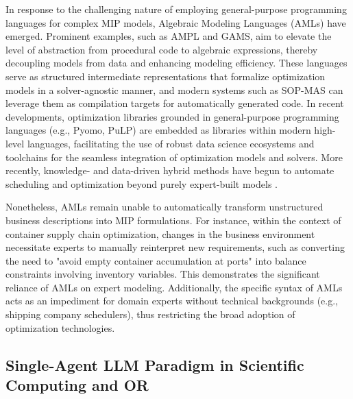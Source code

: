 \documentclass[preprint,12pt]{elsarticle}
\begin{document}
In response to the challenging nature of employing general-purpose programming languages for complex MIP models, Algebraic Modeling Languages (AMLs) have emerged. Prominent examples, such as AMPL and GAMS, aim to elevate the level of abstraction from procedural code to algebraic expressions, thereby decoupling models from data and enhancing modeling efficiency. These languages serve as structured intermediate representations that formalize optimization models in a solver-agnostic manner, and modern systems such as SOP-MAS can leverage them as compilation targets for automatically generated code. In recent developments, optimization libraries grounded in general-purpose programming languages (e.g., Pyomo, PuLP) are embedded as libraries within modern high-level languages, facilitating the use of robust data science ecosystems and toolchains for the seamless integration of optimization models and solvers. More recently, knowledge- and data-driven hybrid methods have begun to automate scheduling and optimization beyond purely expert-built models \citep{zhangKnowledgeDataDriven2025}.

Nonetheless, AMLs remain unable to automatically transform unstructured business descriptions into MIP formulations. For instance, within the context of container supply chain optimization, changes in the business environment necessitate experts to manually reinterpret new requirements, such as converting the need to "avoid empty container accumulation at ports" into balance constraints involving inventory variables. This demonstrates the significant reliance of AMLs on expert modeling. Additionally, the specific syntax of AMLs acts as an impediment for domain experts without technical backgrounds (e.g., shipping company schedulers), thus restricting the broad adoption of optimization technologies.

\subsection{Single-Agent LLM Paradigm in Scientific Computing and OR}
\end{document}
